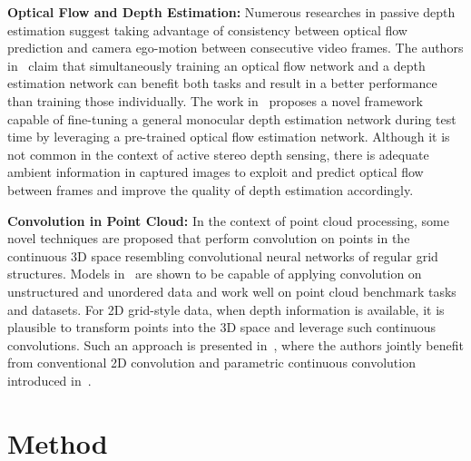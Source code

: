 \bigbreak\noindent\textbf{Optical Flow and Depth Estimation:} Numerous researches in passive depth estimation suggest taking advantage of consistency between optical flow prediction and camera ego-motion between consecutive video frames. The authors in~\cite{wang2019unos, yin2018geonet, zou2018df, ranjan2019competitive} claim that simultaneously training an optical flow network and a depth estimation network can benefit both tasks and result in a better performance than training those individually. The work in~\cite{luo2020consistent} proposes a novel framework capable of fine-tuning a general monocular depth estimation network during test time by leveraging a pre-trained optical flow estimation network. Although it is not common in the context of active stereo depth sensing, there is adequate ambient information in captured images to exploit and predict optical flow between frames and improve the quality of depth estimation accordingly.

\bigbreak\noindent\textbf{Convolution in Point Cloud:} In the context of point cloud processing, some novel techniques are proposed that perform convolution on points in the continuous 3D space resembling convolutional neural networks of regular grid structures. Models in~\cite{thomas2019kpconv, li2018pointcnn, xu2018spidercnn, wu2019pointconv, boulch2020convpoint, wang2018deep} are shown to be capable of applying convolution on unstructured and unordered data and work well on point cloud benchmark tasks and datasets. For 2D grid-style data, when depth information is available, it is plausible to transform points into the 3D space and leverage such continuous convolutions. Such an approach is presented in~\cite{chen2019learning}, where the authors jointly benefit from conventional 2D convolution and parametric continuous convolution introduced in~\cite{wang2018deep}.

\section{Method}

